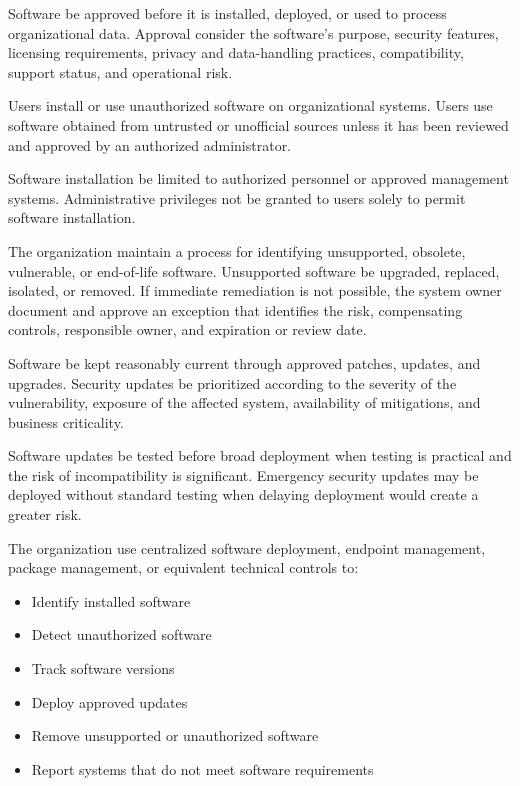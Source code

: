 Software \must{} be approved before it is installed, deployed, or used to process organizational data. Approval \must{} consider the software's purpose, security features, licensing requirements, privacy and data-handling practices, compatibility, support status, and operational risk.

Users \mustnot{} install or use unauthorized software on organizational systems. Users \mustnot{} use software obtained from untrusted or unofficial sources unless it has been reviewed and approved by an authorized administrator.

Software installation \must{} be limited to authorized personnel or approved management systems. Administrative privileges \should{} not be granted to users solely to permit software installation.

The organization \must{} maintain a process for identifying unsupported, obsolete, vulnerable, or end-of-life software. Unsupported software \must{} be upgraded, replaced, isolated, or removed. If immediate remediation is not possible, the system owner \must{} document and approve an exception that identifies the risk, compensating controls, responsible owner, and expiration or review date.

Software \must{} be kept reasonably current through approved patches, updates, and upgrades. Security updates \must{} be prioritized according to the severity of the vulnerability, exposure of the affected system, availability of mitigations, and business criticality.

Software updates \should{} be tested before broad deployment when testing is practical and the risk of incompatibility is significant. Emergency security updates may be deployed without standard testing when delaying deployment would create a greater risk.

The organization \should{} use centralized software deployment, endpoint management, package management, or equivalent technical controls to:
\begin{itemize}
    \item Identify installed software
    \item Detect unauthorized software
    \item Track software versions
    \item Deploy approved updates
    \item Remove unsupported or unauthorized software
    \item Report systems that do not meet software requirements
\end{itemize}

